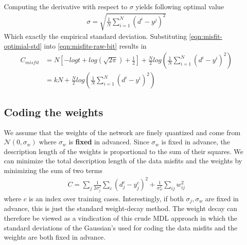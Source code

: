 \documentclass[class=article, crop=false]{standalone}
\numberwithin{equation}{section}
\begin{document}
Computing the derivative with respect to $\sigma$ yields following optimal value 
\begin{align}
    \sigma = \sqrt{\frac{1}{N}\sum\limits_{i=1}^N (d^i-y^j)^2}
\end{align}\label{eqn:misfit-optimial-std}
Which exactly the empirical standard deviation. Substituting \ref{eqn:misfit-optimial-std} into \ref{eqn:misfits-raw-bit} results in 
\begin{align}
    C_{misfit}&=N[-logt + log(\sqrt{2\pi})+\frac{1}{2}] + \frac{N}{2}log(\frac{1}{N}\sum\limits_{i=1}^N (d^i-y^i)^2)\\
    &=kN+\frac{N}{2}log(\frac{1}{N}\sum\limits_{i=1}^N (d^i-y^i)^2)
\end{align}

\subsection{Coding the weights}
We assume that the weights of the network are finely quantized and come from $\mathcal{N}(0, \sigma_w)$ where $\sigma_w$ is \textbf{fixed} in advanced. Since $\sigma_w$ is fixed in advance, the description length of the weights is proportional to the sum of their squares. We can minimize the total description length of the data misfits and the weights by minimizing the sum of two terms
\begin{align}
    C=\sum\limits_j\frac{1}{2\sigma_j^2}\sum\limits_c (d_j^c-y_j^c)^2 + \frac{1}{\sigma_w^2}\sum\limits_{ij}w_{ij}^2
\end{align}
where $c$ is an index over training cases. Interestingly, if both $\sigma_j, \sigma_w$ are fixed in advance, this is just the standard weight-decay method. The weight decay can therefore be viewed as a vindication of this crude MDL approach in which the standard deviations of the Gaussian's used for coding the data misfits and the weights are both fixed in advance.
\end{document}
